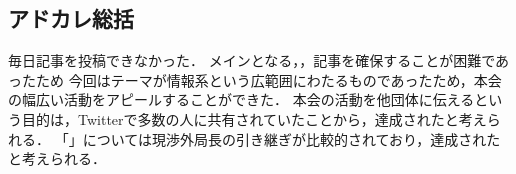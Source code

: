 \subsection*{アドカレ総括}


毎日記事を投稿できなかった．
メインとなる\firstGrade，，記事を確保することが困難であったため
今回はテーマが情報系という広範囲にわたるものであったため，本会の幅広い活動をアピールすることができた．
本会の活動を他団体に伝えるという目的は，Twitterで多数の人に共有されていたことから，達成されたと考えられる．
「」については現渉外局長の引き継ぎが比較的されており，達成されたと考えられる．
